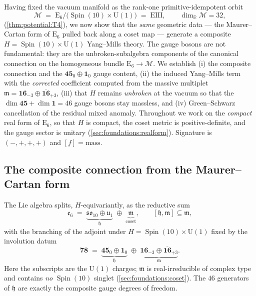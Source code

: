 \documentclass[11pt]{article}
\theoremstyle{plain}
\theoremstyle{definition}
\theoremstyle{remark}
\newcommand{\U}[1]{\mathrm{U}(#1)}
\newcommand{\E}[1]{\mathrm{E}_{#1}}
\newcommand{\Spin}{\operatorname{Spin}}
\newcommand{\Uone}{\U{1}}
\newcommand{\ESix}{\E{6}}
\begin{document}
Having fixed the vacuum manifold as the rank-one primitive-idempotent
orbit
\[
  \mathcal M \;=\; \ESix/\bigl(\Spin(10)\times\Uone\bigr) \;=\; \mathrm{EIII},
  \qquad \dim_{\mathbb R}\mathcal M = 32,
\]
(\autoref{thm:potential:T4}), we now show that the \emph{same} geometric
data --- the Maurer--Cartan form of $\ESix$ pulled back along a coset map
--- generate a composite $H=\Spin(10)\times\Uone$ Yang--Mills theory.
The gauge bosons are not fundamental: they are the unbroken-subalgebra
components of the canonical connection on the homogeneous bundle
$\ESix\to\mathcal M$. We establish (i) the composite connection and the
$\mathbf{45}_{0}\oplus\mathbf{1}_{0}$ gauge content, (ii) the induced
Yang--Mills term with the \emph{corrected} coefficient computed from the
massive multiplet $\mathfrak m=\mathbf{16}_{-3}\oplus\overline{\mathbf{16}}_{+3}$,
(iii) that $H$ remains \emph{unbroken} at the vacuum so that the
$\dim\mathbf{45}+\dim\mathbf 1 = 46$ gauge bosons stay massless, and
(iv) Green--Schwarz cancellation of the residual mixed anomaly. Throughout
we work on the \emph{compact} real form of $\ESix$, so that $H$ is compact,
the coset metric is positive-definite, and the gauge sector is unitary
(\autoref{sec:foundations:realform}). Signature is $(-,+,+,+)$ and
$[f]=\text{mass}$.

\subsection{The composite connection from the Maurer--Cartan form}
\label{sec:gauge:MC}
\label{sec:gauge:composite}

The Lie algebra splits, $H$-equivariantly, as the reductive sum
\begin{equation}\label{eq:gauge:split}
  \mathfrak e_6
  \;=\;
  \underbrace{\mathfrak{so}_{10}\oplus\mathfrak u_{1}}_{\mathfrak h}
  \;\oplus\;
  \underbrace{\mathfrak m}_{\text{coset}},
  \qquad
  [\mathfrak h,\mathfrak m]\subseteq\mathfrak m,
\end{equation}
with the branching of the adjoint under $H=\Spin(10)\times\Uone$ fixed by
the involution datum
\begin{equation}\label{eq:gauge:adjoint}
  \mathbf{78}
  \;=\;
  \underbrace{\mathbf{45}_{0}\oplus\mathbf 1_{0}}_{\mathfrak h}
  \;\oplus\;
  \underbrace{\mathbf{16}_{-3}\oplus\overline{\mathbf{16}}_{+3}}_{\mathfrak m}.
\end{equation}
Here the subscripts are the $\Uone$ charges; $\mathfrak m$ is real-irreducible
of complex type and contains \emph{no} $\Spin(10)$ singlet
(\autoref{sec:foundations:coset}). The $46$ generators of $\mathfrak h$ are
exactly the composite gauge degrees of freedom.
\end{document}
